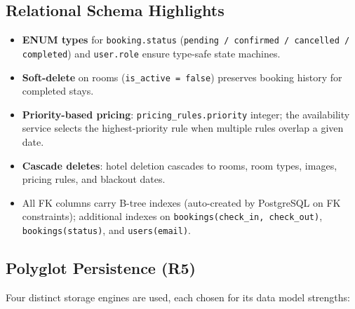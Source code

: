 \documentclass[12pt,a4paper]{article}
\begin{document}
\subsection{Relational Schema Highlights}

\begin{itemize}[noitemsep]
  \item \textbf{ENUM types} for \texttt{booking.status} (\texttt{pending / confirmed / cancelled / completed}) and \texttt{user.role} ensure type-safe state machines.
  \item \textbf{Soft-delete} on rooms (\texttt{is\_active = false}) preserves booking history for completed stays.
  \item \textbf{Priority-based pricing}: \texttt{pricing\_rules.priority} integer; the availability service selects the highest-priority rule when multiple rules overlap a given date.
  \item \textbf{Cascade deletes}: hotel deletion cascades to rooms, room types, images, pricing rules, and blackout dates.
  \item All FK columns carry B-tree indexes (auto-created by PostgreSQL on FK constraints); additional indexes on \texttt{bookings(check\_in,~check\_out)}, \texttt{bookings(status)}, and \texttt{users(email)}.
\end{itemize}

\subsection{Polyglot Persistence (R5)}

Four distinct storage engines are used, each chosen for its data model strengths:
\end{document}
